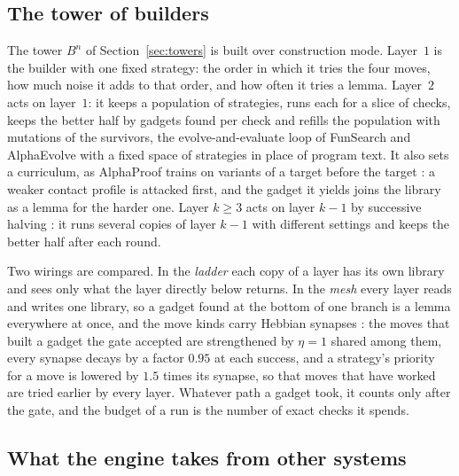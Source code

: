 \subsection{The tower of builders}\label{ssec:tower}

The tower $B^{n}$ of Section~\ref{sec:towers} is built over construction mode. Layer~$1$ is the builder with one fixed strategy: the order in which it tries the four moves, how much noise it adds to that order, and how often it tries a lemma. Layer~$2$ acts on layer~$1$: it keeps a population of strategies, runs each for a slice of checks, keeps the better half by gadgets found per check and refills the population with mutations of the survivors, the evolve-and-evaluate loop of FunSearch and AlphaEvolve \cite{RBN24,NVE25} with a fixed space of strategies in place of program text. It also sets a curriculum, as AlphaProof trains on variants of a target before the target \cite{HMS25}: a weaker contact profile is attacked first, and the gadget it yields joins the library as a lemma for the harder one. Layer $k\ge3$ acts on layer $k-1$ by successive halving \cite{JT16}: it runs several copies of layer $k-1$ with different settings and keeps the better half after each round.

Two wirings are compared. In the \emph{ladder} each copy of a layer has its own library and sees only what the layer directly below returns. In the \emph{mesh} every layer reads and writes one library, so a gadget found at the bottom of one branch is a lemma everywhere at once, and the move kinds carry Hebbian synapses \cite{Heb49}: the moves that built a gadget the gate accepted are strengthened by $\eta=1$ shared among them, every synapse decays by a factor $0.95$ at each success, and a strategy's priority for a move is lowered by $1.5$ times its synapse, so that moves that have worked are tried earlier by every layer. Whatever path a gadget took, it counts only after the gate, and the budget of a run is the number of exact checks it spends.

\subsection{What the engine takes from other systems}\label{ssec:sources}

